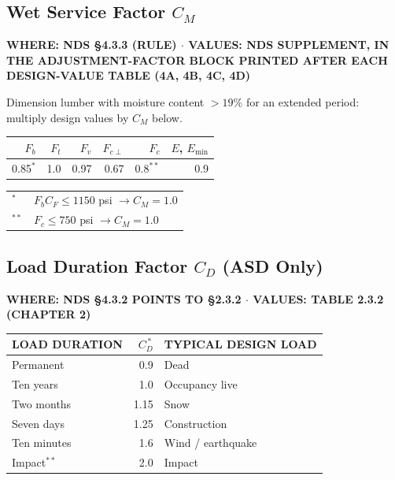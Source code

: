 \documentclass[10pt]{article}
\begin{document}
\subsection{Wet Service Factor $C_M$}

{\ttfamily\footnotesize\bfseries WHERE: NDS \S 4.3.3 (RULE) $\cdot$ VALUES: NDS SUPPLEMENT, IN THE ADJUSTMENT-FACTOR BLOCK PRINTED AFTER EACH DESIGN-VALUE TABLE (4A, 4B, 4C, 4D)}

\medskip
Dimension lumber with moisture content $>19\%$ for an extended period: multiply design values by $C_M$ below.

\medskip
{\setlength{\arrayrulewidth}{0.5pt}\ttfamily\footnotesize
\begin{tabular}{@{}rrrrrr@{}}
\hline
{\scriptsize $F_b$} & {\scriptsize $F_t$} & {\scriptsize $F_v$} & {\scriptsize $F_{c\perp}$} & {\scriptsize $F_c$} & {\scriptsize $E$, $E_{\min}$} \\
\hline
0.85$^{*}$ & 1.0 & 0.97 & 0.67 & 0.8$^{**}$ & 0.9 \\
\hline
\end{tabular}}

\smallskip
{\ttfamily\footnotesize
\begin{tabular}{@{}ll@{}}
$^{*}$  & $F_b C_F \le 1150$ psi $\rightarrow C_M = 1.0$ \\
$^{**}$ & $F_c \le 750$ psi $\rightarrow C_M = 1.0$ \\
\end{tabular}}

\subsection{Load Duration Factor $C_D$ (ASD Only)}

{\ttfamily\footnotesize\bfseries WHERE: NDS \S 4.3.2 POINTS TO \S 2.3.2 $\cdot$ VALUES: TABLE 2.3.2 (CHAPTER 2)}

\medskip
{\setlength{\arrayrulewidth}{0.5pt}\ttfamily\footnotesize
\begin{tabular}{@{}lrl@{}}
\hline
{\scriptsize LOAD DURATION} & {\scriptsize $C_D^{\,*}$} & {\scriptsize TYPICAL DESIGN LOAD} \\
\hline
Permanent   & 0.9  & Dead \\
Ten years   & 1.0  & Occupancy live \\
Two months  & 1.15 & Snow \\
Seven days  & 1.25 & Construction \\
Ten minutes & 1.6  & Wind / earthquake \\
Impact$^{**}$ & 2.0 & Impact \\
\hline
\end{tabular}}
\end{document}
